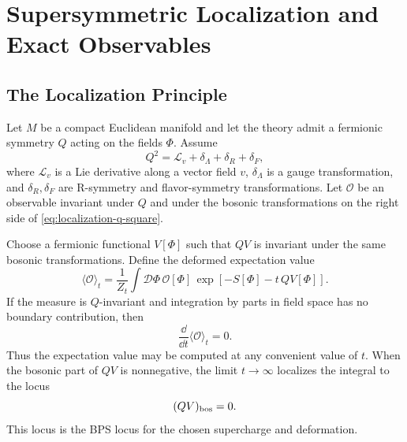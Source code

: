 \chapter{Supersymmetric Localization and Exact Observables}
\label{ch:volume-iii-supersymmetric-localization-exact-observables}

\section{The Localization Principle}

Let \(M\) be a compact Euclidean manifold and let the theory admit a
fermionic symmetry \(Q\) acting on the fields \(\Phi\).  Assume
\[
  Q^2=\mathcal L_v+\delta_{\Lambda}+\delta_R+\delta_F,
  \label{eq:localization-q-square}
\]
where \(\mathcal L_v\) is a Lie derivative along a vector field \(v\),
\(\delta_{\Lambda}\) is a gauge transformation, and \(\delta_R,\delta_F\) are
R-symmetry and flavor-symmetry transformations.  Let \(\mathcal O\) be an
observable invariant under \(Q\) and under the bosonic transformations on the
right side of \eqref{eq:localization-q-square}.

Choose a fermionic functional \(V[\Phi]\) such that \(QV\) is invariant under
the same bosonic transformations.  Define the deformed expectation value
\[
  \langle\mathcal O\rangle_t
  =
  \frac1{Z_t}\int\mathcal D\Phi\,
  \mathcal O[\Phi]\,
  \exp\left[-S[\Phi]-t\,QV[\Phi]\right].
\]
If the measure is \(Q\)-invariant and integration by parts in field space has
no boundary contribution, then
\[
  \frac{\dd}{\dd t}\langle\mathcal O\rangle_t=0.
\]
Thus the expectation value may be computed at any convenient value of \(t\).
When the bosonic part of \(QV\) is nonnegative, the limit \(t\to\infty\)
localizes the integral to the locus
\begin{equation}
  (QV)_{\rm bos}=0.
  \label{eq:localization-bps-locus}
\end{equation}
This locus is the BPS locus for the chosen supercharge and deformation.

